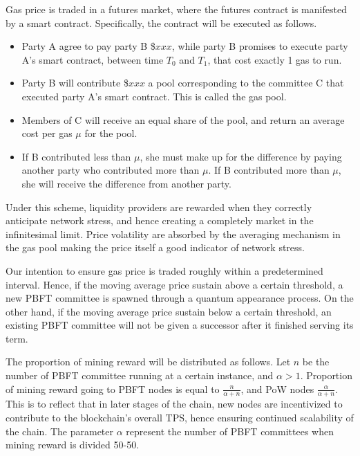 \documentclass[9pt,oneside]{amsart}
\begin{document}
\begin{multicols}{2}
Gas price is traded in a futures market, where the futures contract is manifested by a smart contract. Specifically, the contract will be executed as follows. 

\begin{itemize}
	\item Party A agree to pay party B \$$xxx$, while party B promises to execute party A's smart contract, between time $T_0$ and $T_1$, that cost exactly 1 gas to run.
	
	\item Party B will contribute \$$xxx$ a pool corresponding to the committee C that executed party A's smart contract. This is called the gas pool. 
	
	\item Members of C will receive an equal share of the pool, and return an average cost per gas $\mu$ for the pool.
	
	\item If B contributed less than $\mu$, she must make up for the difference by paying another party who contributed more than $\mu$. If B contributed more than $\mu$, she will receive the difference from another party. 
	
\end{itemize}     

Under this scheme, liquidity providers are rewarded when they correctly anticipate network stress, and hence creating a completely market in the infinitesimal limit. Price volatility are absorbed by the averaging mechanism in the gas pool making the price itself a good indicator of network stress. 

Our intention to ensure gas price is traded roughly within a predetermined interval. Hence, if the moving average price sustain above a certain threshold, a new PBFT committee is spawned through a quantum appearance process. On the other hand, if the moving average price sustain below a certain threshold, an existing PBFT committee will not be given a successor after it finished serving its term.

The proportion of mining reward will be distributed as follows. Let $n$ be the number of PBFT committee running at a certain instance, and $\alpha > 1$. Proportion of mining reward going to PBFT nodes is equal to $\frac{n}{\alpha + n}$, and PoW nodes $\frac{\alpha}{\alpha+n}$. This is to reflect that in later stages of the chain, new nodes are incentivized to contribute to the blockchain's overall TPS, hence ensuring continued scalability of the chain. The parameter $\alpha$ represent the number of PBFT committees when mining reward is divided 50-50.  


\end{multicols}
\end{document}
